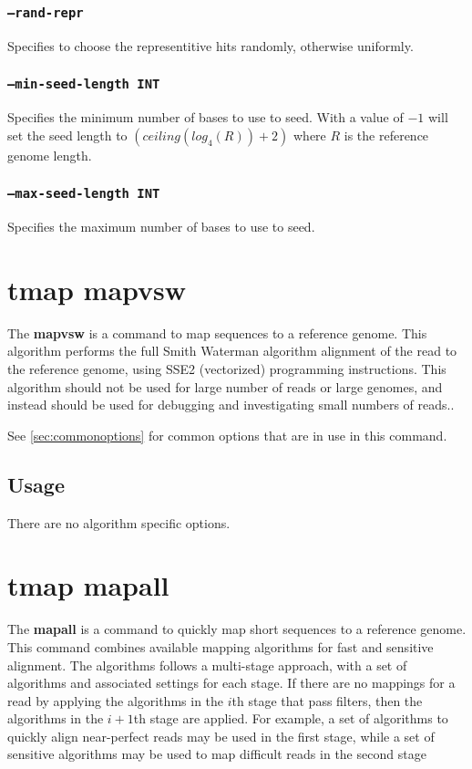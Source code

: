 \documentclass[a4paper,12pt]{book}
\newcommand{\TT}[1]{{\tt #1}} %
\newcommand{\BF}[1]{{\bf #1}} %
\begin{document}
\subsubsection{\TT{--rand-repr}}
Specifies to choose the representitive hits randomly, otherwise uniformly.

\subsubsection{\TT{--min-seed-length INT}}
Specifies the minimum number of bases to use to seed.
With a value of $-1$ will set the seed length to $\left(ceiling(log_4(R)) + 2\right)$ where $R$ is the reference genome length.

\subsubsection{\TT{--max-seed-length INT}}
Specifies the maximum number of bases to use to seed.

\section{tmap mapvsw}
\label{sec:mapvsw}
The \BF{mapvsw} is a command to map sequences to a reference genome.
This algorithm performs the full Smith Waterman algorithm alignment of the read to the reference genome, using SSE2 (vectorized) programming instructions.
This algorithm should not be used for large number of reads or large genomes, and instead should be used for debugging and investigating small numbers of reads..

See \autoref{sec:commonoptions} for common options that are in use in this command.

\subsection{Usage}
There are no algorithm specific options.

\section{tmap mapall}
\label{sec:mapall}
The \BF{mapall} is a command to quickly map short sequences to a reference genome.
This command combines available mapping algorithms for fast and sensitive alignment.
The algorithms follows a multi-stage approach, with a set of algorithms and associated settings for each stage.
If there are no mappings for a read by applying the algorithms in the $i$th stage that pass filters, then the algorithms in the $i+1$th stage are applied. 
For example, a set of algorithms to quickly align near-perfect reads may be used in the first stage, while a set of sensitive algorithms may be used to map difficult reads in the second stage
\end{document}
